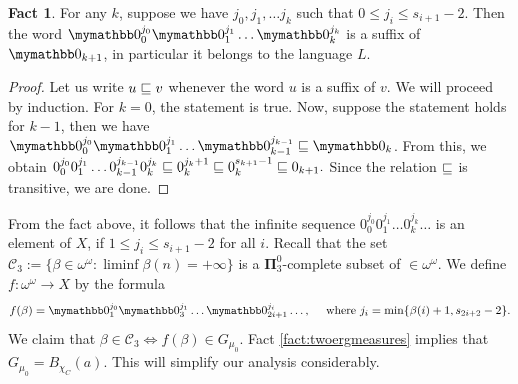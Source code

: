 \documentclass{amsart}
\theoremstyle{definition}
\newtheorem{fact}[thm]{Fact}
\newcommand{\bP}{\boldsymbol{\Pi}}
\begin{document}
\begin{fact} \label{fact:zeroseq}
	For any $k$, suppose we have $j_0, j_1, \dots j_k$ such that $0 \leq j_i \leq s_{i+1} - 2$.
	Then the word $\zero_0^{j_0} \zero_1^{j_1} \dots \zero_k^{j_k}$ is a suffix of $\zero_{k+1}$,
	in particular it belongs to the language $L$.
\end{fact}
\begin{proof}
	Let us write $u \sqsubseteq v$ whenever the word $u$ is a suffix of $v$.
	We will proceed by induction.
	For $k=0$, the statement is true.
	Now, suppose the statement holds for $k-1$, then we have
	$\zero_0^{j_0} \zero_1^{j_1} \dots \zero_{k-1}^{j_{k-1}} \suf \zero_k$.
	From this, we obtain
	$
		0_0^{j_0} 0_1^{j_1} \dots 0_{k-1}^{j_{k-1}} 0_{k}^{j_{k}} \sqsubseteq
		0_k^{j_k + 1} \sqsubseteq 0_k^{s_{k+1} - 1} \sqsubseteq 0_{k+1}.
	$
	Since the relation $\sqsubseteq$ is transitive, we are done.
\end{proof}
From the fact above, it follows that the infinite sequence $0_0^{j_0} 0_1^{j_1} \dots 0_k^{j_k} \dots$ is an element of $X$, if $1 \leq j_i \leq s_{i+1} - 2$ for all $i$. Recall that the set
$ \mathcal{C}_3 := \{ \beta \in \omega ^ \omega : \liminf \beta(n) = +\infty \} $
is a $\bP_3^0$-complete subset of $\in \omega ^ \omega$. We define $ f : \omega ^ \omega \rightarrow X $ by the formula
$$ f(\beta) = \zero_1^{j_0} \zero_3^{j_1} \dots \zero_{2i+1}^{j_i} \dots, \quad \textrm{ where } j_i = \min\{ \beta(i) + 1, s_{2i+2} - 2 \}.$$
We claim that $\beta \in \mathcal{C}_3 \Leftrightarrow f(\beta) \in G_{\mu_0}$.
Fact \ref{fact:twoergmeasures} implies that $G_{\mu_0} = B_{\chi_C}(a)$.
This will simplify our analysis considerably.
\end{document}
